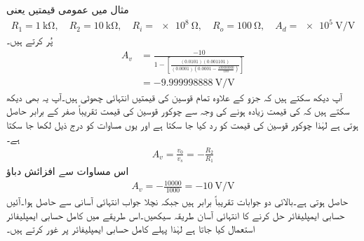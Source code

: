 مثال  میں  عمومی قیمتیں یعنی 
\begin{align*}
R_1=\SI{1}{\kilo\ohm}, \quad R_2=\SI{10}{\kilo\ohm}, \quad R_i=\SI{e8}{\ohm}, \quad R_o=\SI{100}{\ohm}, \quad A_d=\SI{e5}{\volt\per\volt}
\end{align*}
پُر کرتے ہیں۔
\begin{align*}
A_v&=\frac{-10}{1-\left[\frac{\left(0.0101\right)\left(0.001101\right)}{\left(0.0001\right)\left(0.0001-\frac{100000000}{100}\right)}\right]} \\
&=\SI{-9.999998888}{\volt\per\volt}
\end{align*}
آپ دیکھ سکتے ہیں کہ  جزو کے علاوہ تمام قوسین کی قیمتیں انتہائی چھوٹی ہیں۔آپ یہ بھی دیکھ سکتے ہیں کہ  کی قیمت زیادہ ہونے کی وجہ سے چوکور قوسین کی قیمت تقریباً صفر کے برابر حاصل ہوتی ہے لہٰذا چوکور قوسین کی قیمت کو رد کیا جا سکتا ہے اور یوں مساوات  کو درج ذیل لکھا جا سکتا ہے۔
\begin{align}\label{مساوات_حسابی_غیر_کامل_حل}
A_v=\frac{v_0}{v_s}=-\frac{R_2}{R_1}
\end{align}
اس مساوات سے افزائش دباؤ 
\begin{align*}
A_v=-\frac{10000}{1000}=\SI{-10}{\volt\per\volt}
\end{align*}
حاصل ہوتی ہے۔بالائی دو جوابات تقریباً برابر ہیں جبکہ نچلا جواب انتہائی آسانی سے حاصل ہوا۔آئیں حسابی ایمپلیفائر حل کرنے کا انتہائی آسان طریقہ سیکھیں۔اس طریقے میں کامل حسابی ایمپلیفائر استعمال کیا جاتا ہے لہٰذا پہلے کامل حسابی ایمپلیفائر پر غور کرتے ہیں۔

